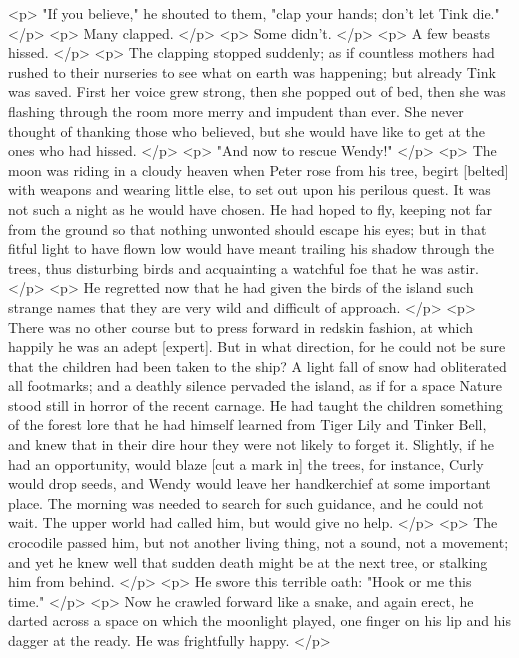     <p>
      "If you believe," he shouted to them, "clap your hands; don't let Tink
      die."
    </p>
    <p>
      Many clapped.
    </p>
    <p>
      Some didn't.
    </p>
    <p>
      A few beasts hissed.
    </p>
    <p>
      The clapping stopped suddenly; as if countless mothers had rushed to their
      nurseries to see what on earth was happening; but already Tink was saved.
      First her voice grew strong, then she popped out of bed, then she was
      flashing through the room more merry and impudent than ever. She never
      thought of thanking those who believed, but she would have like to get at
      the ones who had hissed.
    </p>
    <p>
      "And now to rescue Wendy!"
    </p>
    <p>
      The moon was riding in a cloudy heaven when Peter rose from his tree,
      begirt [belted] with weapons and wearing little else, to set out upon his
      perilous quest. It was not such a night as he would have chosen. He had
      hoped to fly, keeping not far from the ground so that nothing unwonted
      should escape his eyes; but in that fitful light to have flown low would
      have meant trailing his shadow through the trees, thus disturbing birds
      and acquainting a watchful foe that he was astir.
    </p>
    <p>
      He regretted now that he had given the birds of the island such strange
      names that they are very wild and difficult of approach.
    </p>
    <p>
      There was no other course but to press forward in redskin fashion, at
      which happily he was an adept [expert]. But in what direction, for he
      could not be sure that the children had been taken to the ship? A light
      fall of snow had obliterated all footmarks; and a deathly silence pervaded
      the island, as if for a space Nature stood still in horror of the recent
      carnage. He had taught the children something of the forest lore that he
      had himself learned from Tiger Lily and Tinker Bell, and knew that in
      their dire hour they were not likely to forget it. Slightly, if he had an
      opportunity, would blaze [cut a mark in] the trees, for instance, Curly
      would drop seeds, and Wendy would leave her handkerchief at some important
      place. The morning was needed to search for such guidance, and he could
      not wait. The upper world had called him, but would give no help.
    </p>
    <p>
      The crocodile passed him, but not another living thing, not a sound, not a
      movement; and yet he knew well that sudden death might be at the next
      tree, or stalking him from behind.
    </p>
    <p>
      He swore this terrible oath: "Hook or me this time."
    </p>
    <p>
      Now he crawled forward like a snake, and again erect, he darted across a
      space on which the moonlight played, one finger on his lip and his dagger
      at the ready. He was frightfully happy.
    </p>
